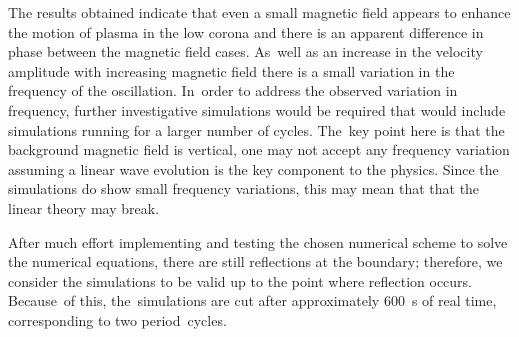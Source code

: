 \documentclass[physics,article,accept,pdftex,moreauthors]{Definitions/mdpi}
\begin{document}
 {The} 
 results {obtained} 
indicate that even a small magnetic field appears to enhance the motion of plasma in the low corona and  there is an apparent difference in phase between the magnetic field cases. As~well as an increase in the velocity amplitude with increasing magnetic field there is a small variation in the frequency of the oscillation. In~order to address  the observed variation in frequency, further investigative simulations would be required  that would include simulations running for a larger number of cycles.  The~key point here is that the background magnetic field is vertical, one may not accept any frequency variation assuming a linear wave evolution is the key component to the physics. Since the simulations do show small frequency variations, this may mean that that the linear theory may break.
  





After much  effort implementing and testing  the chosen numerical scheme to solve the numerical equations, there are still reflections at the boundary; therefore, we consider the simulations to be valid up to the point where reflection occurs. Because~of this, the~simulations are cut after approximately 600~s of real time, corresponding to two period~cycles.
\end{document}
